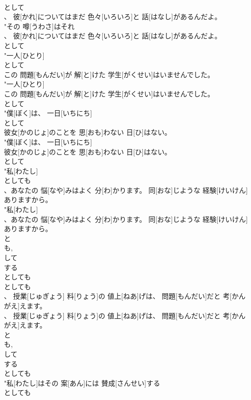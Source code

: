 \documentclass[8pt]{extreport}
\begin{document}
\begin{CJK}{UTF8}{min}
\\	として
\\	、 彼[かれ]についてはまだ 色々[いろいろ]と 話[はなし]があるんだよ。
\\	"その 噂[うわさ]はそれ
\\	、 彼[かれ]についてはまだ 色々[いろいろ]と 話[はなし]があるんだよ。
\\	として
\\	"一人[ひとり]
\\	として
\\	この 問題[もんだい]が 解[と]けた 学生[がくせい]はいませんでした。
\\	"一人[ひとり]
\\	この 問題[もんだい]が 解[と]けた 学生[がくせい]はいませんでした。
\\	として
\\	"僕[ぼく]は、 一日[いちにち]
\\	として
\\	彼女[かのじょ]のことを 思[おも]わない 日[ひ]はない。
\\	"僕[ぼく]は、 一日[いちにち]
\\	彼女[かのじょ]のことを 思[おも]わない 日[ひ]はない。
\\	として
\\	"私[わたし]
\\	としても
\\	、あなたの 悩[なや]みはよく 分[わ]かります。 同[おな]じような 経験[けいけん]ありますから。
\\	"私[わたし]
\\	、あなたの 悩[なや]みはよく 分[わ]かります。 同[おな]じような 経験[けいけん]ありますから。
\\	と 
\\	も, 
\\	して 
\\	する 
\\	としても
\\	としても
\\	、 授業[じゅぎょう] 料[りょう]の 値上[ねあ]げは、 問題[もんだい]だと 考[かんがえ]えます。
\\	、 授業[じゅぎょう] 料[りょう]の 値上[ねあ]げは、 問題[もんだい]だと 考[かんがえ]えます。
\\	と 
\\	も, 
\\	して 
\\	する 
\\	としても
\\	"私[わたし]はその 案[あん]には 賛成[さんせい]する
\\	としても

\end{CJK}
\end{document}
